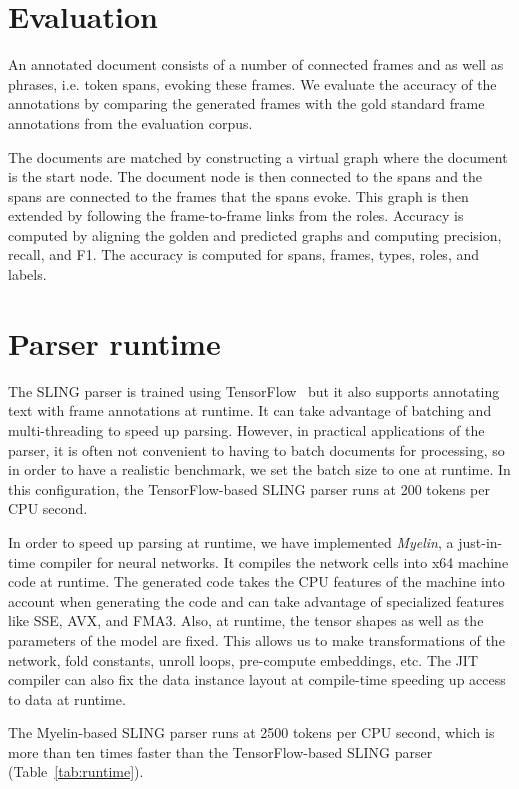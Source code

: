 \documentclass[11pt,a4paper]{article}
\begin{document}
\section{Evaluation}

An annotated document consists of a number of connected frames and as well as
phrases, i.e. token spans, evoking these frames. We evaluate the accuracy of the
annotations by comparing the generated frames with the gold standard frame
annotations from the evaluation corpus.

The documents are matched by constructing a virtual graph where the document
is the start node. The document node is then connected to the spans and the
spans are connected to the frames that the spans evoke. This graph is then
extended by following the frame-to-frame links from the roles. Accuracy is
computed by aligning the golden and predicted graphs and computing precision,
recall, and F1. The accuracy is computed for spans, frames, types, roles, and
labels.

\section{Parser runtime}

The SLING parser is trained using TensorFlow~\cite{tensorflow} but it also
supports annotating text with frame annotations at runtime. It can take
advantage of batching and multi-threading to speed up parsing. However, in
practical applications of the parser, it is often not convenient to having to
batch documents for processing, so in order to have a realistic benchmark, we
set the batch size to one at runtime. In this configuration, the
TensorFlow-based SLING parser runs at 200 tokens per CPU second.

In order to speed up parsing at runtime, we have implemented \emph{Myelin}, a
just-in-time compiler for neural networks. It compiles the network cells into
x64 machine code at runtime. The generated code takes the CPU features of the
machine into account when generating the code and can take advantage of
specialized features like SSE, AVX, and FMA3.
Also, at runtime, the tensor shapes as well as the parameters of the model are
fixed.
This allows us to make transformations of the network, fold constants, unroll
loops, pre-compute embeddings, etc. The JIT compiler can also fix the data
instance layout at compile-time speeding up access to data at runtime.

The Myelin-based SLING parser runs at 2500 tokens per CPU second, which is more
than ten times faster than the TensorFlow-based SLING parser
(Table~\ref{tab:runtime}).
\end{document}
